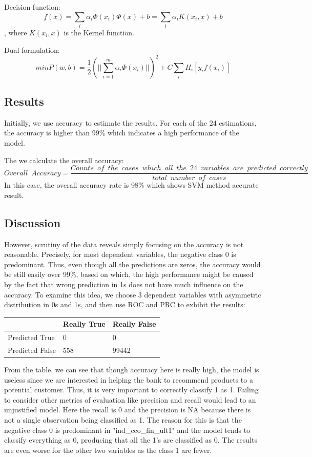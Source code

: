 \documentclass{article}
\begin{document}
\begin{spacing}{1}
\begin{large}
Decision function:
$$f(x) = \displaystyle\sum_{i}\alpha_i\Phi(x_i)\Phi(x)+b = \displaystyle\sum_{i}\alpha_{i} K(x_i, x)+b$$, where $K(x_i, x)$ is the Kernel function.

Dual formulation:
$$min P(w,b) = \frac{1}{2}(||\displaystyle\sum_{i=1}^{m}\alpha_i\Phi(x_i)||)^2 + C\displaystyle\sum_{i}H_{i}[y_{i}f(x_i)]$$

\subsection{Results}

Initially, we use accuracy to estimate the results. For each of the 24 estimations, the accuracy is higher than 99\% which indicates a high performance of the model.

The we calculate the overall accuracy:
$$Overall\enspace Accuracy = \frac{Counts\enspace of\enspace the\enspace cases\enspace which\enspace all\enspace the\enspace 24\enspace variables\enspace are\enspace predicted\enspace correctly}{total\enspace number\enspace of\enspace cases}$$
In this case, the overall accuracy rate is 98\% which shows SVM method accurate result.

\subsection{Discussion}

However, scrutiny of the data reveals simply focusing on the accuracy is not reasonable. Precisely, for most dependent variables, the negative class 0 is predominant. Thus, even though all the predictions are zeros, the accuracy would be still easily over 99\%, based on which, the high performance might be caused by the fact that wrong prediction in 1s does not have much influence on the accuracy. To examine this idea, we choose 3 dependent variables with asymmetric distribution in 0s and 1s, and then use ROC and PRC to exhibit the results:

\vspace{5mm}
\begin{tabular}{| l | l | l |}
	\hline
	& Really True & Really False \\ \hline
	Predicted True & 0 & 0 \\ \hline
	Predicted False & 558 & 99442\\
	\hline
\end{tabular}
\vspace{5mm}

From the table, we can see that though accuracy here is really high, the model is  useless since we are  interested in helping the bank to recommend products to a potential customer. Thus, it is very important to correctly classify 1 as 1. Failing to consider other metrics of evaluation like precision and recall would lead to an unjustified model. Here the recall is 0 and the precision is NA because there is not a single observation being classified as 1. The reason for this is that the negative class 0 is predominant in "ind\_cco\_fin\_ult1" and the model tends to classify everything as 0, producing that all the 1’s are classified as 0. The results are even worse for the other two variables as the class 1 are fewer.


\end{large}
\end{spacing}
\end{document}
